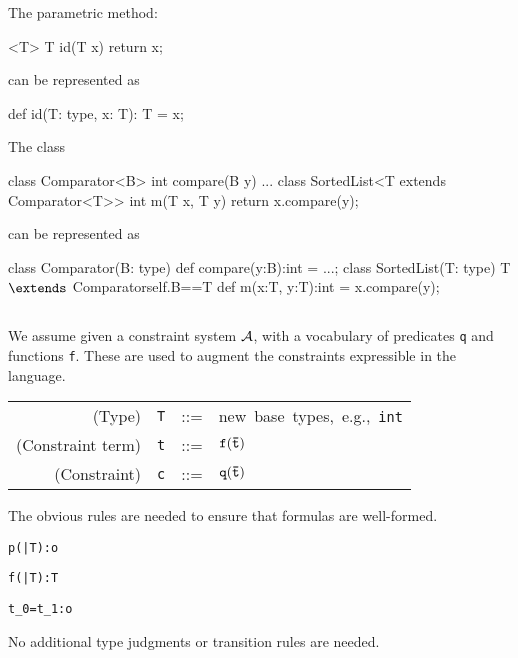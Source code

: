 \begin{example}
The \FGJ{} parametric method:

\begin{xten} 
 <T> T id(T x) { return x; }
\end{xten}
\noindent can be represented as
\begin{xten} 
def id(T: type, x: T): T = x;
\end{xten}
\end{example}

\begin{example}
\noindent The \FGJ{} class 
\begin{xten} 
class Comparator<B> {
  int compare(B y) { ... } }
class SortedList<T extends Comparator<T>> { 
  int m(T x, T y) {
     return x.compare(y); } }
\end{xten}
\noindent can be represented as
\begin{xtenmath} 
class Comparator(B: type) {
  def compare(y:B):int = ...;
}
class SortedList(T: type)
    {T $\extends$ Comparator{self.B==T}} { 
  def m(x:T, y:T):int = x.compare(y);
}
\end{xtenmath}
\end{example}

\subsection{\FXD}
We assume given a constraint system $\cal A$, with a vocabulary of
predicates {\tt q} and functions {\tt f}. These are used to 
augment the constraints expressible in the language. 

\begin{tabular}{r@{\quad}rcl}
  (Type) & {\tt T} & {::=}& \mbox{new base types, e.g., {\tt int}}\\
  (Constraint term) & {\tt t} &{::=}& $\tt f(\bar{\tt t})$ \\
  (Constraint) & {\tt c} &{::=}& ${\tt q(\bar{\tt t})}$ 
\end{tabular}

\noindent
The obvious rules are needed to ensure that formulas are well-formed.

{
	{\Gamma \vdash \tt p(\bar{\tt T}):o}

	{\Gamma\tt \vdash \tt f(\bar{\tt T}):T}

	{\Gamma\tt \vdash t_0=t_1:o}
}
\noindent
No additional type judgments or transition rules are needed. 

